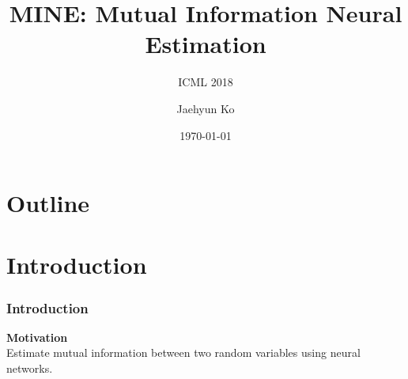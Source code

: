 \documentclass[aspectratio=169]{beamer}
\begin{document}


\begin{frame}
	\title{MINE: Mutual Information Neural Estimation \cite{mine}}
	\subtitle{ICML 2018}
	\author{Jaehyun Ko}
	\date{\today}
	\titlepage
\end{frame}


\section*{Outline}
\begin{frame}
\tableofcontents
\end{frame}



\section{Introduction}
\begin{frame}
	\frametitle{Introduction}
	\textbf{Motivation} \\ Estimate mutual information between two random variables using neural networks. \\
\end{frame}

\end{document}

